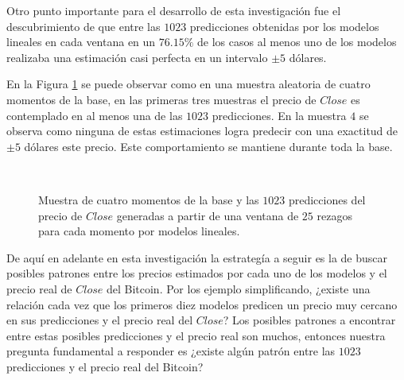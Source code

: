 \documentclass[a4paper,12pt,twocolumn]{article}
\begin{document}
Otro punto importante para el desarrollo de esta investigación fue el descubrimiento de que entre las $1023$ predicciones obtenidas por los modelos lineales en cada ventana en un  $76.15\%$ de los casos al menos uno de los modelos realizaba una estimación casi perfecta en un intervalo $\pm 5$ dólares. 

En la Figura \ref{muestras} se puede observar como en una muestra aleatoria de cuatro momentos de la base, en las primeras tres muestras el precio de $Close$ es contemplado en al menos una de las $1023$ predicciones. En la muestra $4$ se observa como ninguna de estas estimaciones logra predecir con una exactitud de $\pm 5$ dólares este precio. Este comportamiento se mantiene durante toda la base.

\begin{figure}[!htb]
\centering
{}\\
\hfill
{}\hfill
{}
\caption{Muestra de cuatro momentos de la base y las $1023$ predicciones del precio de $Close$ generadas a partir de una ventana de $25$ rezagos para cada momento por modelos lineales.}
\label{muestras}
\end{figure}
%

De aquí en adelante en esta investigación la estrategía a seguir es la de buscar posibles patrones entre los precios estimados por cada uno de los modelos y el precio real de $Close$ del Bitcoin. Por los ejemplo simplificando, ¿existe una relación cada vez que los primeros diez modelos predicen un precio muy cercano en sus predicciones y el precio real del $Close$? Los posibles patrones a encontrar entre estas posibles predicciones y el precio real son muchos, entonces nuestra pregunta fundamental a responder es ¿existe algún patrón entre las $1023$ predicciones y el precio real del Bitcoin?
\end{document}
